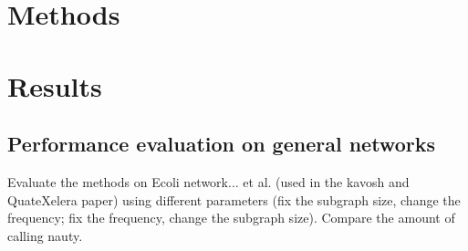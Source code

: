 \documentclass[9pt,oneside]{article}
\begin{document}

\section{Methods}

\section{Results}
\subsection{Performance evaluation on general networks}
{\color{blue} Evaluate the methods on Ecoli network... et al.  (used in the kavosh and QuateXelera paper) using different parameters (fix the subgraph size, change the frequency; fix the frequency, change the subgraph size). Compare the amount of calling nauty.}
\end{document}
